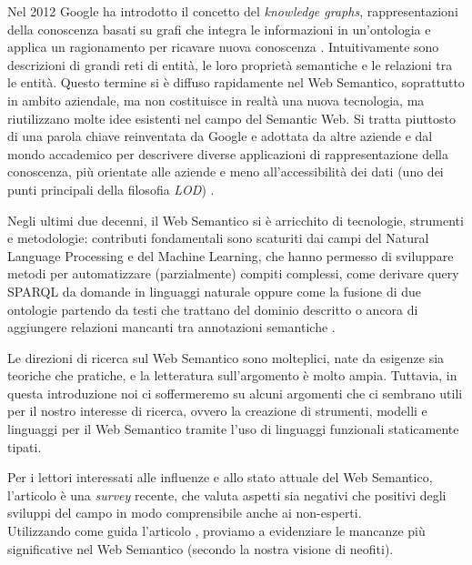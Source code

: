 Nel 2012 Google ha introdotto il concetto del \emph{knowledge graphs}, rappresentazioni della conoscenza basati su grafi che integra le informazioni in un'ontologia e applica un ragionamento per ricavare nuova conoscenza \cite{ehrlinger2016towards}. Intuitivamente sono descrizioni di grandi reti di entità, le loro proprietà semantiche e le relazioni tra le entità. Questo termine si è diffuso rapidamente nel Web Semantico, soprattutto in ambito aziendale, ma non costituisce in realtà una nuova tecnologia, ma riutilizzano molte idee esistenti nel campo del Semantic Web. Si tratta piuttosto di una parola chiave reinventata da Google e adottata da altre aziende e dal mondo accademico per descrivere diverse applicazioni di rappresentazione della conoscenza, più orientate alle aziende e meno all'accessibilità dei dati (uno dei punti principali della filosofia \textit{LOD}) \cite{ehrlinger2016towards, hitzler2021review}.

Negli ultimi due decenni, il Web Semantico si è arricchito di tecnologie, strumenti e metodologie: contributi fondamentali sono scaturiti dai campi del Natural Language Processing e del Machine Learning, che hanno permesso di sviluppare metodi per automatizzare (parzialmente) compiti complessi, come derivare query SPARQL da domande in linguaggi naturale \cite{Evseev2020SPARQLQG, Zlatareva2021ProcessingNL, Hu2021NaturalLQ} oppure come la fusione di due ontologie partendo da testi che trattano del dominio descritto \cite{caldarolaMultiStrategyApproach} o ancora di aggiungere relazioni mancanti tra annotazioni semantiche \cite{discoveringmissingsemanticrelation, repairinghiddenlinks}. 

Le direzioni di ricerca sul Web Semantico sono molteplici, nate da esigenze sia teoriche che pratiche, e la letteratura sull'argomento è molto ampia. Tuttavia, in questa introduzione noi ci soffermeremo su alcuni argomenti che ci sembrano utili per il nostro interesse di ricerca, ovvero la creazione di strumenti, modelli e linguaggi per il Web Semantico tramite l'uso di linguaggi funzionali staticamente tipati.

Per i lettori interessati alle influenze e allo stato attuale del Web Semantico, l'articolo \cite{hitzler2021review} è una \emph{survey} recente, che valuta aspetti sia negativi che positivi degli sviluppi del campo in modo comprensibile anche ai non-esperti.\\
Utilizzando come guida l'articolo \cite{hitzler2021review}, proviamo a evidenziare le mancanze più significative nel Web Semantico (secondo la nostra visione di neofiti).
